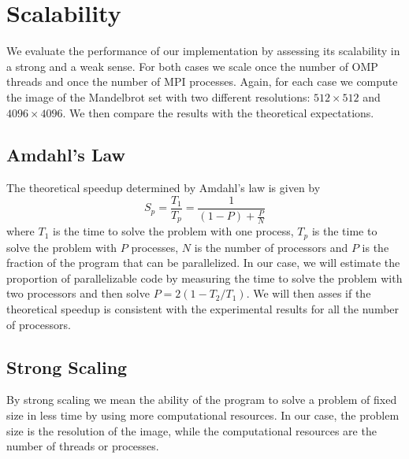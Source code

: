 \section{Scalability}
    We evaluate the performance of our implementation by assessing its scalability
    in a strong and a weak sense. For both cases we scale once the number of OMP threads
    and once the number of MPI processes. Again, for each case we compute the
    image of the Mandelbrot set with two different resolutions: $512 \times 512$
    and $4096 \times 4096$. We then compare the results with the theoretical
    expectations.

\subsection{Amdahl's Law}
    The theoretical speedup determined by Amdahl's law is given by
    $$
        S_p = \frac{T_1}{T_p} = \frac{1}{(1-P)+\frac{P}{N}}
    $$
    where $T_1$ is the time to solve the problem with one process, $T_p$ is the
    time to solve the problem with $P$ processes, $N$ is the number of processors
    and $P$ is the fraction of the program that can be parallelized.
    In our case, we will estimate the proportion of parallelizable code
    by measuring the time to solve the problem with two processors and then
    solve $P = 2 \left (1 - T_2/T_1 \right )$. We will then asses if the
    theoretical speedup is consistent with the experimental results for all
    the number of processors. \\

\subsection{Strong Scaling}
    By strong scaling we mean the ability of the program to solve a problem
    of fixed size in less time by using more computational resources. In our
    case, the problem size is the resolution of the image, while the computational
    resources are the number of threads or processes.
